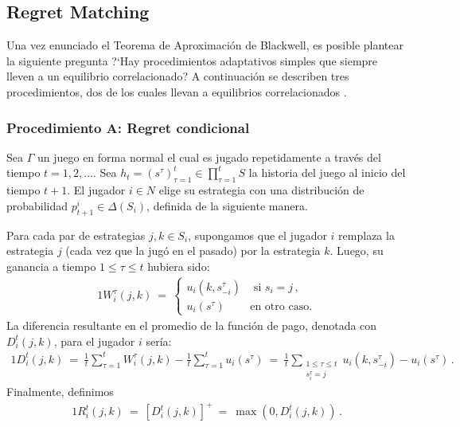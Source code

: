 
\subsection{Regret Matching}
Una vez enunciado el Teorema de Aproximación de Blackwell, es posible plantear la siguiente pregunta ?`Hay procedimientos adaptativos simples que siempre lleven a un equilibrio correlacionado? A continuación se describen tres procedimientos, dos de los cuales llevan a equilibrios correlacionados \cite{bib:correlated-equilibrium}.

\subsubsection{Procedimiento A: Regret condicional}

Sea $\Gamma$ un juego en forma normal el cual es jugado repetidamente a través del tiempo $t = 1, 2, \ldots $. 
Sea $h_t = (s^\tau)_{\tau = 1}^t \in \prod_{\tau = 1}^{t} S$ la historia del juego al inicio del tiempo $t+1$. El jugador $i \in N$ elige su estrategia con una distribución de probabilidad $p_{t+1}^i \in \Delta(S_i)$, definida de la siguiente manera.

Para cada par de estrategias $j, k \in S_i$, supongamos que el jugador $i$ remplaza la estrategia $j$ (cada vez que la jugó en el pasado) por la estrategia $k$. Luego, su ganancia a tiempo $1\leq \tau \leq t$ hubiera sido:
\begin{alignat}{1}
W_i^{\tau}(j,k)\ =\ 
\begin{cases}
u_i(k, s_{-i}^{\tau}) &\text{ si } s_i = j \,, \\
u_i(s^\tau) & \text{en otro caso.} 
\end{cases}
\end{alignat}
La diferencia resultante en el promedio de la función de pago, denotada con $D_i^t(j, k)$, para el jugador $i$ sería:
\begin{alignat}{1}
  D_i^t(j, k)\ 
    =\ \frac{1}{t} \sum_{\tau = 1}^{t} W_i^{\tau}(j, k) - \frac{1}{t} \sum_{\tau = 1}^{t} u_i(s^{\tau})\ 
	=\ \frac{1}{t} \sum_{\substack{1\leq \tau \leq t \\s^\tau_i = j}} u_i(k, s_{-i}^{\tau}) - u_i(s^{\tau}) \,.
\end{alignat}
Finalmente, definimos
\begin{alignat}{1}
\label{eq:regret}
R_i^t(j, k)\ =\ [D_i^t(j, k)]^+\ =\ \max(0, D_i^t(j, k)) \,.
\end{alignat}

